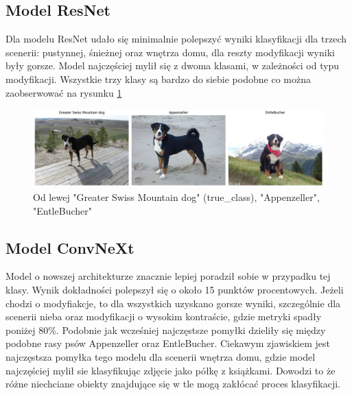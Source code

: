 \subsection*{Model ResNet}

Dla modelu ResNet udało się minimalnie polepszyć wyniki klasyfikacji dla trzech scenerii: pustynnej, śnieżnej oraz wnętrza domu, dla reszty modyfikacji wyniki były gorsze. Model najczęściej mylił się z dwoma klasami, w zależności od typu modyfikacji. Wszystkie trzy klasy są bardzo do siebie
podobne co można zaobserwować na rysunku \ref*{rys:238}  

\begin{figure}
	\centering\includegraphics[width=.9\textwidth]{img/238}
	\caption{Od lewej "Greater Swiss Mountain dog" (true\_class), "Appenzeller", "EntleBucher"}
	\label{rys:238}
\end{figure}

\subsection*{Model ConvNeXt}

Model o nowszej architekturze znacznie lepiej poradził sobie w przypadku tej klasy. Wynik dokładności polepszył się o około 15 punktów procentowych. Jeżeli chodzi o modyfiakcje, to dla wszystkich uzyskano gorsze wyniki, szczególnie dla scenerii nieba oraz modyfikacji o wysokim kontraście, gdzie
metryki spadły poniżej 80\%. Podobnie jak wcześniej najczęstsze pomyłki dzieliły się między podobne rasy psów Appenzeller oraz EntleBucher. Ciekawym zjawiskiem jest najczęstsza pomyłka tego modelu dla scenerii wnętrza domu, gdzie model najczęściej mylił sie klasyfikując zdjęcie jako
półkę z książkami. Dowodzi to że różne niechciane obiekty znajdujące się w tle mogą zakłócać proces klasyfikacji. 


